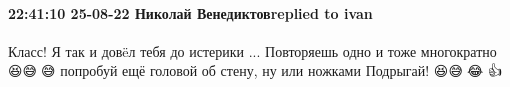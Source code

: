  
 
 
 
 

\paragraph{22:41:10 25-08-22 Николай Венедиктовreplied to ivan}

Класс! Я так и довëл тебя до истерики ... Повторяешь одно и тоже многократно
😆😅🤣😅 попробуй ещё головой об стену, ну или ножками Подрыгай! 😆😅🤣😂 👍
